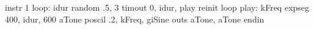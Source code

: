 instr 1
loop:
idur      random    .5, 3
          timout    0, idur, play
          reinit    loop
play:
kFreq     expseg    400, idur, 600
aTone     poscil    .2, kFreq, giSine
          outs      aTone, aTone
endin